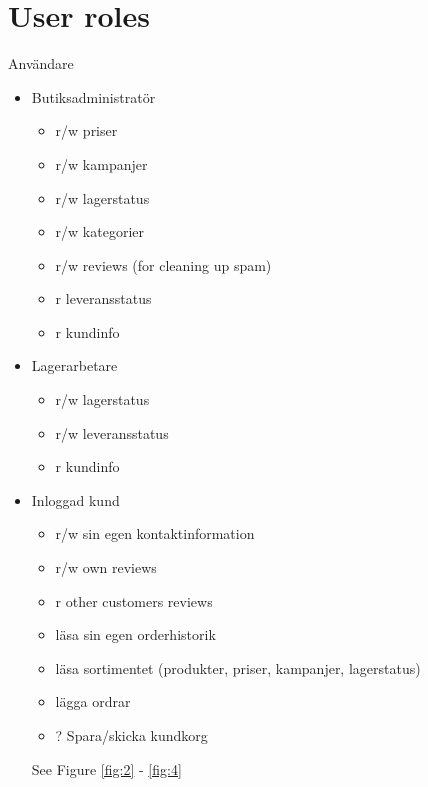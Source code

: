 \documentclass[paper=a4, fontsize=11pt]{report} %
\begin{document}
\section*{User roles}

%

Användare
\begin{itemize}
	\item Butiksadministratör
		\begin{itemize}
			\item r/w priser
			\item r/w kampanjer
			\item r/w lagerstatus
			\item r/w kategorier
			\item r/w reviews (for cleaning up spam)
			\item r leveransstatus
			\item r kundinfo
		\end{itemize}
	\item Lagerarbetare
		\begin{itemize}
			\item r/w lagerstatus
			\item r/w leveransstatus
			\item r kundinfo
		\end{itemize}
	\item Inloggad kund
		\begin{itemize}
			\item r/w sin egen kontaktinformation
			\item r/w own reviews
			\item r other customers reviews
			\item läsa sin egen orderhistorik
			\item läsa sortimentet (produkter, priser, kampanjer, lagerstatus)
			\item lägga ordrar
			\item ? Spara/skicka kundkorg
		\end{itemize}

	See Figure \ref{fig:2} - \ref{fig:4}


\end{itemize}
\end{document}
